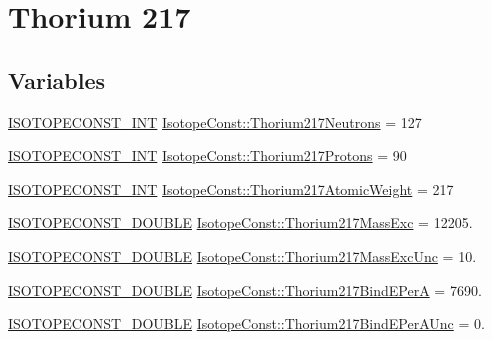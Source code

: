 \hypertarget{group___isotope_const-_thorium-_th217}{}\section{Thorium 217}
\label{group___isotope_const-_thorium-_th217}
\subsection*{Variables}
\begin{DoxyCompactItemize}
\item 
\mbox{\hyperlink{group___isotope_const-_macros_ga5f18360b3e99483a35c32d789e62621c}{I\+S\+O\+T\+O\+P\+E\+C\+O\+N\+S\+T\+\_\+\+I\+NT}} \mbox{\hyperlink{group___isotope_const-_thorium-_th217_gafab5d68564b73f0adc2585251a7c4d43}{Isotope\+Const\+::\+Thorium217\+Neutrons}} = 127
\item 
\mbox{\hyperlink{group___isotope_const-_macros_ga5f18360b3e99483a35c32d789e62621c}{I\+S\+O\+T\+O\+P\+E\+C\+O\+N\+S\+T\+\_\+\+I\+NT}} \mbox{\hyperlink{group___isotope_const-_thorium-_th217_ga310393b58364a1cff0589698ed0c1261}{Isotope\+Const\+::\+Thorium217\+Protons}} = 90
\item 
\mbox{\hyperlink{group___isotope_const-_macros_ga5f18360b3e99483a35c32d789e62621c}{I\+S\+O\+T\+O\+P\+E\+C\+O\+N\+S\+T\+\_\+\+I\+NT}} \mbox{\hyperlink{group___isotope_const-_thorium-_th217_ga647c8135bf7145448c15f74e598e856e}{Isotope\+Const\+::\+Thorium217\+Atomic\+Weight}} = 217
\item 
\mbox{\hyperlink{group___isotope_const-_macros_ga8f45a7272ce02c0b4c65c44636ed719a}{I\+S\+O\+T\+O\+P\+E\+C\+O\+N\+S\+T\+\_\+\+D\+O\+U\+B\+LE}} \mbox{\hyperlink{group___isotope_const-_thorium-_th217_ga2e8e84e09ddcaa11a527daaad08a72c4}{Isotope\+Const\+::\+Thorium217\+Mass\+Exc}} = 12205.
\item 
\mbox{\hyperlink{group___isotope_const-_macros_ga8f45a7272ce02c0b4c65c44636ed719a}{I\+S\+O\+T\+O\+P\+E\+C\+O\+N\+S\+T\+\_\+\+D\+O\+U\+B\+LE}} \mbox{\hyperlink{group___isotope_const-_thorium-_th217_ga5be26d70557f6ccff6cfca760135e190}{Isotope\+Const\+::\+Thorium217\+Mass\+Exc\+Unc}} = 10.
\item 
\mbox{\hyperlink{group___isotope_const-_macros_ga8f45a7272ce02c0b4c65c44636ed719a}{I\+S\+O\+T\+O\+P\+E\+C\+O\+N\+S\+T\+\_\+\+D\+O\+U\+B\+LE}} \mbox{\hyperlink{group___isotope_const-_thorium-_th217_gadec4ca29329641834fd85a4838c0f4e3}{Isotope\+Const\+::\+Thorium217\+Bind\+E\+PerA}} = 7690.
\item 
\mbox{\hyperlink{group___isotope_const-_macros_ga8f45a7272ce02c0b4c65c44636ed719a}{I\+S\+O\+T\+O\+P\+E\+C\+O\+N\+S\+T\+\_\+\+D\+O\+U\+B\+LE}} \mbox{\hyperlink{group___isotope_const-_thorium-_th217_gaf3ee81ce81a9268010b041cb5c476a01}{Isotope\+Const\+::\+Thorium217\+Bind\+E\+Per\+A\+Unc}} = 0.

\end{DoxyCompactItemize}
